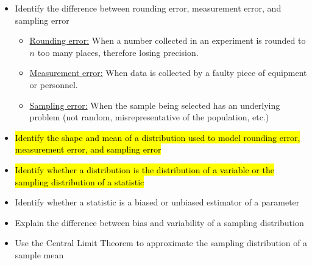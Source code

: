 \documentclass[11pt]{article} %
\begin{document}
\begin{itemize}
\item Identify the difference between rounding error, measurement error, and sampling error
\begin{itemize}
\item {\color{red} \underline{Rounding error:} When a number collected in an experiment is rounded to $n$ too many places, therefore losing precision.}
\item {\color{red} \underline{Measurement error:} When data is collected by a faulty piece of equipment or personnel.}
\item {\color{red} \underline{Sampling error:} When the sample being selected has an underlying problem (not random, misrepresentative of the population, etc.)}
\end{itemize}
\item \hl{Identify the shape and mean of a distribution used to model rounding error, measurement error, and sampling error}
\item \hl{Identify whether a distribution is the distribution of a variable or the sampling distribution of a statistic}
\item Identify whether a statistic is a biased or unbiased estimator of a parameter
\item Explain the difference between bias and variability of a sampling distribution
\item Use the Central Limit Theorem to approximate the sampling distribution of a sample mean
\end{itemize}
\end{document}
